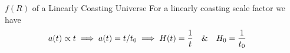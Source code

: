 \documentclass[final,hyperref={pdfpagelabels=false}]{beamer}
\begin{document}
\begin{frame}[t]
\begin{columns}[t]
\begin{column}{.03\textwidth}\end{column} %
% 
\begin{column}{.465\textwidth} %
%
%
%
%
%
%
%     
%
%
\begin{block}{$f(R)$ of a Linearly Coasting Universe}
For a linearly coasting scale factor we have 
\begin{equation}
a(t)\propto t \implies a(t)=t/t_0 \implies H(t)={1 \over t}~~~\&~~~H_0={1\over t_0}
\end{equation}


\end{block}
\end{column}
\end{columns}
\end{frame}
\end{document}
